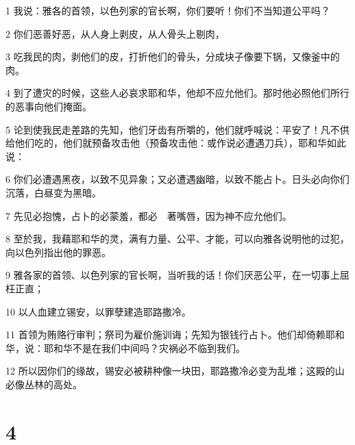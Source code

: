 \par 1 我说：雅各的首领，以色列家的官长啊，你们要听！你们不当知道公平吗？
\par 2 你们恶善好恶，从人身上剥皮，从人骨头上剔肉，
\par 3 吃我民的肉，剥他们的皮，打折他们的骨头，分成块子像要下锅，又像釜中的肉。
\par 4 到了遭灾的时候，这些人必哀求耶和华，他却不应允他们。那时他必照他们所行的恶事向他们掩面。
\par 5 论到使我民走差路的先知，他们牙齿有所嚼的，他们就呼喊说：平安了！凡不供给他们吃的，他们就预备攻击他（预备攻击他：或作说必遭遇刀兵），耶和华如此说：
\par 6 你们必遭遇黑夜，以致不见异象；又必遭遇幽暗，以致不能占卜。日头必向你们沉落，白昼变为黑暗。
\par 7 先见必抱愧，占卜的必蒙羞，都必　著嘴唇，因为神不应允他们。
\par 8 至於我，我藉耶和华的灵，满有力量、公平、才能，可以向雅各说明他的过犯，向以色列指出他的罪恶。
\par 9 雅各家的首领、以色列家的官长啊，当听我的话！你们厌恶公平，在一切事上屈枉正直；
\par 10 以人血建立锡安，以罪孽建造耶路撒冷。
\par 11 首领为贿赂行审判；祭司为雇价施训诲；先知为银钱行占卜。他们却倚赖耶和华，说：耶和华不是在我们中间吗？灾祸必不临到我们。
\par 12 所以因你们的缘故，锡安必被耕种像一块田，耶路撒冷必变为乱堆；这殿的山必像丛林的高处。

\chapter{4}

